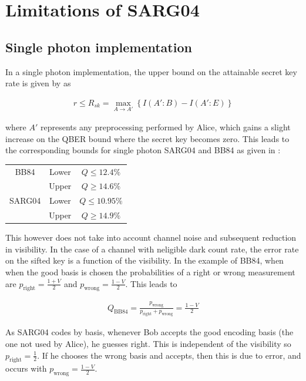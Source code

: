 \documentclass[paper=a4, fontsize=11pt]{scrartcl} %
\numberwithin{equation}{section} %
\numberwithin{figure}{section} %
\numberwithin{table}{section} %
\begin{document}
\clearpage
\section{Limitations of SARG04}
\subsection{Single photon implementation}
In a single photon implementation, the upper bound on the attainable secret key rate is given by \citet{csiszarAssump} as

\begin{align}
r \leq R_{sk} = \max_{A \rightarrow A'}
\left\{
I(A':B) - I(A': E)
\right\}
\end{align}

where $A'$ represents any preprocessing performed by Alice, which gains a slight increase on the QBER bound where the secret key
becomes zero. This leads to the corresponding bounds for single photon SARG04 and BB84 as given in \citet{bounds, branciardSARG04}:

\bgroup
\def\arraystretch{1.2}%
\begin{center}
\begin{tabular}{c c c}
\hline
BB84 						& Lower & $Q \leq 12.4\%$ \\
\hphantom{BB84}	& Upper & $Q \geq 14.6\%$\\
\hline
SARG04  				& Lower & $Q \leq 10.95\%$ \\
\hphantom{BB84}	& Upper & $Q \geq 14.9\%$\\
\hline
\end{tabular}
\end{center}
\egroup

This however does not take into account channel noise and subsequent reduction in visibility. In the case of a channel with
neligible dark count rate, the error rate on the sifted key is a function of the visibility. In the example of BB84, when
when the good basis is chosen the probabilities of a right or wrong measurement are $p_{\mathrm{right}} = \frac{1+V}{2}$ and
$p_{\mathrm{wrong}} = \frac{1-V}{2}$. This leads to

\begin{align}
	Q_{\mathrm{BB84}} =
	\frac{p_{\mathrm{wrong}}}{p_{\mathrm{right}} + p_{\mathrm{wrong}}}
	= \frac{1-V}{2}
\end{align}

As SARG04 codes by basis, whenever Bob accepts the good encoding basis (the one not used by Alice), he guesses right.
This is independent of the visibility so $p_{\mathrm{right}} = \frac{1}{2}$. If he chooses the wrong basis and accepts,
then this is due to error, and occurs with $p_{\mathrm{wrong}} = \frac{1-V}{2}$.
\end{document}
